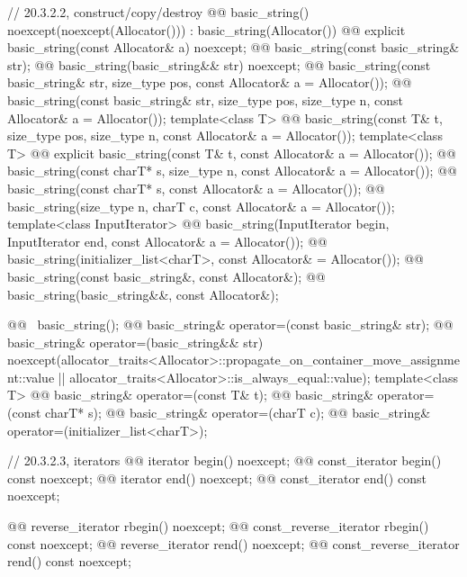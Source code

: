 \documentclass{wg21}
\begin{document}
\begin{codeblock}
{{    // 20.3.2.2, construct/copy/destroy
    @@
    basic_string() noexcept(noexcept(Allocator())) : basic_string(Allocator()) { }
    @@
    explicit basic_string(const Allocator& a) noexcept;
    @@
    basic_string(const basic_string& str);
    @@
    basic_string(basic_string&& str) noexcept;
    @@
    basic_string(const basic_string& str, size_type pos, const Allocator& a = Allocator());
    @@
    basic_string(const basic_string& str, size_type pos, size_type n,
                 const Allocator& a = Allocator());
    template<class T>
      @@
      basic_string(const T& t, size_type pos, size_type n, const Allocator& a = Allocator());
    template<class T>
      @@ explicit basic_string(const T& t, const Allocator& a = Allocator());
    @@ basic_string(const charT* s, size_type n, const Allocator& a = Allocator());
    @@ basic_string(const charT* s, const Allocator& a = Allocator());
    @@ basic_string(size_type n, charT c, const Allocator& a = Allocator());
    template<class InputIterator>
      @@
      basic_string(InputIterator begin, InputIterator end, const Allocator& a = Allocator());
    @@ basic_string(initializer_list<charT>, const Allocator& = Allocator());
    @@ basic_string(const basic_string&, const Allocator&);
    @@ basic_string(basic_string&&, const Allocator&);

    @@ ~basic_string();
    @@ basic_string& operator=(const basic_string& str);
    @@ basic_string& operator=(basic_string&& str)
      noexcept(allocator_traits<Allocator>::propagate_on_container_move_assignment::value ||
               allocator_traits<Allocator>::is_always_equal::value);
    template<class T>
      @@ basic_string& operator=(const T& t);
    @@ basic_string& operator=(const charT* s);
    @@ basic_string& operator=(charT c);
    @@ basic_string& operator=(initializer_list<charT>);

    // 20.3.2.3, iterators
    @@ iterator       begin() noexcept;
    @@ const_iterator begin() const noexcept;
    @@ iterator       end() noexcept;
    @@ const_iterator end() const noexcept;

    @@ reverse_iterator       rbegin() noexcept;
    @@ const_reverse_iterator rbegin() const noexcept;
    @@ reverse_iterator       rend() noexcept;
    @@ const_reverse_iterator rend() const noexcept;

}}
\end{codeblock}
\end{document}
